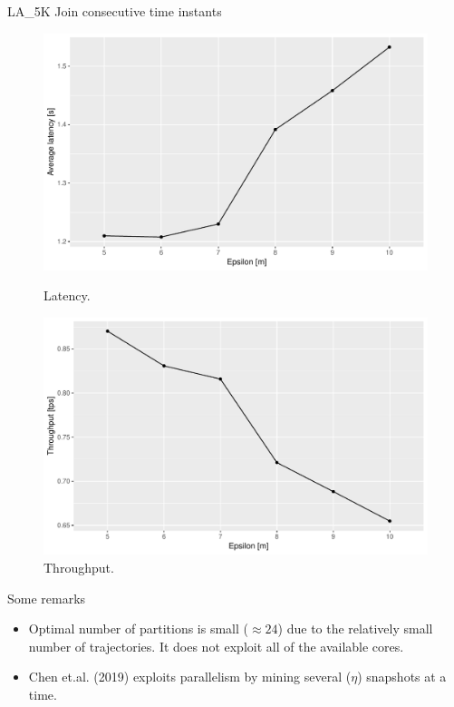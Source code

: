 \documentclass{beamer}
\begin{document}
\begin{frame}{LA\_5K Join consecutive time instants}
    \centering
    \begin{figure}
        \begin{minipage}[b]{0.48\textwidth}
            \includegraphics[width=\textwidth]{figures/LA_5K_JoinLatency}
            \caption{Latency.}
        \end{minipage}
        \hfill
        \begin{minipage}[b]{0.48\textwidth}
            \includegraphics[width=\textwidth]{figures/LA_5K_JoinThroughput}
            \caption{Throughput.}
        \end{minipage}
    \end{figure}    
\end{frame}

\begin{frame}{Some remarks}
    \begin{itemize}
        \item Optimal number of partitions is small ($\approx 24$) due to the relatively small number of trajectories. It does not exploit all of the available cores.
        \item Chen et.al. (2019) exploits parallelism by mining several ($\eta$) snapshots at a time.
    \end{itemize}
\end{frame}
\end{document}
